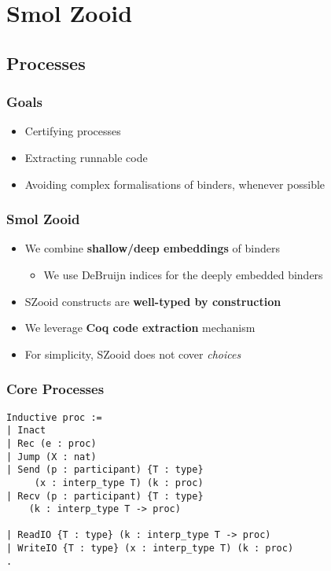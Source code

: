 \section{Smol Zooid}

\subsection{Processes}

\begin{frame}
    \frametitle{Goals}
    \begin{sticky}
    \begin{itemize}
    \item Certifying processes
    \item Extracting runnable code
    \item Avoiding complex formalisations of binders, whenever possible
    \end{itemize}
    \end{sticky}
\end{frame}

\begin{frame}
    \frametitle{Smol Zooid}
    \begin{greenbox}{}
    \begin{itemize}
    \item We combine \textbf{shallow/deep embeddings} of binders
    \begin{itemize}
    \item We use DeBruijn indices for the deeply embedded binders
    \end{itemize}
    \item SZooid constructs are \textbf{well-typed by construction}
    \item We leverage \textbf{Coq code extraction} mechanism
    \item For simplicity, SZooid does not cover \emph{choices}
    \end{itemize}
    \end{greenbox}
\end{frame}

\begin{frame}[fragile]
    \frametitle{Core Processes}
    \begin{verbatim}
Inductive proc :=
| Inact
| Rec (e : proc)
| Jump (X : nat)
| Send (p : participant) {T : type}
     (x : interp_type T) (k : proc)
| Recv (p : participant) {T : type}
    (k : interp_type T -> proc)

| ReadIO {T : type} (k : interp_type T -> proc)
| WriteIO {T : type} (x : interp_type T) (k : proc)
.
    \end{verbatim}    
\end{frame}

